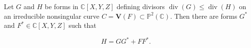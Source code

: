 Let $G$ and $H$ be forms in $\mathbb{C}[X, Y, Z]$ defining divisors $\operatorname{div}(G) \leqslant \operatorname{div}(H)$ on an irreducible nonsingular curve $C = \mathbf{V}(F) \subset \mathbb{P}^2(\mathbb{C})$. Then there are forms $G^*$ and $F^* \in \mathbb{C}[X, Y, Z]$ such that

$$H = GG^* + FF^*.$$
